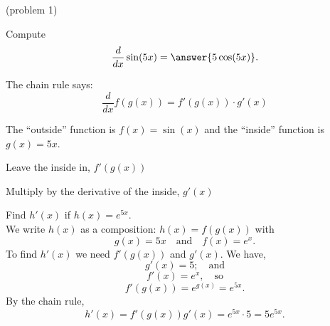 \documentclass[handout]{ximera}
\begin{document}
\begin{center}
\begin{foldable}
\end{foldable}
\end{center}

\begin{problem}(problem 1)
  
Compute
  \[
  \frac{d}{dx} \sin(5x) = \answer{5\cos(5x)}.
  \]
    \begin{hint}
      The chain rule says:
      \[
      \frac{d}{dx} f(g(x)) = f'(g(x))\cdot g'(x)
      \]
    \end{hint}
    \begin{hint}
      The ``outside'' function is $f(x) = \sin(x)$ and the ``inside''
      function is $g(x) = 5x$.
    \end{hint}
    \begin{hint}
		  Leave the inside in, $f'(g(x))$
		\end{hint}
		\begin{hint}
		  Multiply by the derivative of the inside, $g'(x)$
		\end{hint}
	 
\end{problem}



\begin{example}[example 2]

Find $h'(x)$ if $h(x) = e^{5x}$.\\
We write $h(x)$ as a composition: $h(x)=f(g(x))$ with
\[
g(x) = 5x  \quad \text{and} \quad f(x) = e^x.
\]
To find $h'(x)$ we need $f'(g(x))$ and $g'(x)$. We have,
\[
g'(x) = 5; \quad \text{and} 
\]
\[
f'(x) = e^x, \quad \text{so}
\]
\[
f'(g(x)) =e^{g(x)} = e^{5x}.
\]
By the chain rule,
\[
h'(x) = f'(g(x))g'(x) = e^{5x} \cdot 5 = 5e^{5x}.
\]

\end{example}


\begin{center}
\begin{foldable}
\end{foldable}
\end{center}
\end{document}
